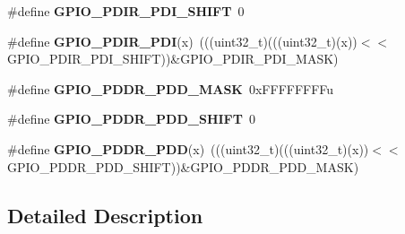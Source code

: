 \begin{DoxyCompactItemize}
\#define {\bfseries G\+P\+I\+O\+\_\+\+P\+D\+I\+R\+\_\+\+P\+D\+I\+\_\+\+S\+H\+I\+FT}~0
\item 
\mbox{\label{group___g_p_i_o___register___masks_ga8f80c8e42743151c73569b5cef49f2b2}} 
\#define {\bfseries G\+P\+I\+O\+\_\+\+P\+D\+I\+R\+\_\+\+P\+DI}(x)~(((uint32\+\_\+t)(((uint32\+\_\+t)(x))$<$$<$G\+P\+I\+O\+\_\+\+P\+D\+I\+R\+\_\+\+P\+D\+I\+\_\+\+S\+H\+I\+FT))\&G\+P\+I\+O\+\_\+\+P\+D\+I\+R\+\_\+\+P\+D\+I\+\_\+\+M\+A\+SK)
\item 
\mbox{\label{group___g_p_i_o___register___masks_ga67567a60f48d2bfb5584cd8de8936788}} 
\#define {\bfseries G\+P\+I\+O\+\_\+\+P\+D\+D\+R\+\_\+\+P\+D\+D\+\_\+\+M\+A\+SK}~0x\+F\+F\+F\+F\+F\+F\+F\+Fu
\item 
\mbox{\label{group___g_p_i_o___register___masks_gacdd12c96f7650759c90a98bb606bd776}} 
\#define {\bfseries G\+P\+I\+O\+\_\+\+P\+D\+D\+R\+\_\+\+P\+D\+D\+\_\+\+S\+H\+I\+FT}~0
\item 
\mbox{\label{group___g_p_i_o___register___masks_ga9836cb3ac719630f741fe6a0292083fc}} 
\#define {\bfseries G\+P\+I\+O\+\_\+\+P\+D\+D\+R\+\_\+\+P\+DD}(x)~(((uint32\+\_\+t)(((uint32\+\_\+t)(x))$<$$<$G\+P\+I\+O\+\_\+\+P\+D\+D\+R\+\_\+\+P\+D\+D\+\_\+\+S\+H\+I\+FT))\&G\+P\+I\+O\+\_\+\+P\+D\+D\+R\+\_\+\+P\+D\+D\+\_\+\+M\+A\+SK)
\end{DoxyCompactItemize}


\subsection{Detailed Description}
